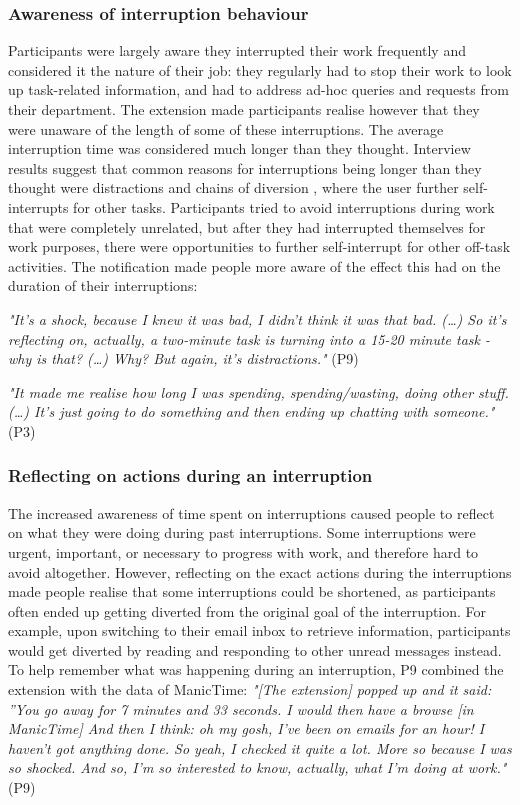 \subsubsection{Awareness of interruption behaviour}
Participants were largely aware they interrupted their work frequently and considered it the nature of their job: they regularly had to stop their work to look up task-related information, and had to address ad-hoc queries and requests from their department. The extension made participants realise however that they were unaware of the length of some of these interruptions. The average interruption time was considered much longer than they thought. 
Interview results suggest that common reasons for interruptions being longer than they thought were distractions and chains of diversion \citep{Hanrahan2015, Iqbal2007}, where the user further self-interrupts for other tasks. Participants tried to avoid interruptions during work that were completely unrelated, but after they had interrupted themselves for work purposes, there were opportunities to further self-interrupt for other off-task activities. The notification made people more aware of the effect this had on the duration of their interruptions:

\textit{"It's a shock, because I knew it was bad, I didn't think it was that bad. (…) So it's reflecting on, actually, a two-minute task is turning into a 15-20 minute task - why is that? (…) Why? But again, it's distractions."} (P9)

\textit{"It made me realise how long I was spending, spending/wasting, doing other stuff. (…)  It’s just going to do something and then ending up chatting with someone."} (P3)

\subsubsection{Reflecting on actions during an interruption}
The increased awareness of time spent on interruptions caused people to reflect on what they were doing during past interruptions. Some interruptions were urgent, important, or necessary to progress with work, and therefore hard to avoid altogether. However, reflecting on the exact actions during the interruptions made people realise that some interruptions could be shortened, as participants often ended up getting diverted from the original goal of the interruption. For example, upon switching to their email inbox to retrieve information, participants would get diverted by reading and responding to other unread messages instead. To help remember what was happening during an interruption, P9 combined the extension with the data of ManicTime: \textit{"[The extension] popped up and it said: ”You go away for 7 minutes and 33 seconds. I would then have a browse [in ManicTime] And then I think: oh my gosh, I've been on emails for an hour! I haven't got anything done. So yeah, I checked it quite a lot. More so because I was so shocked. And so, I'm so interested to know, actually, what I'm doing at work."} (P9)

